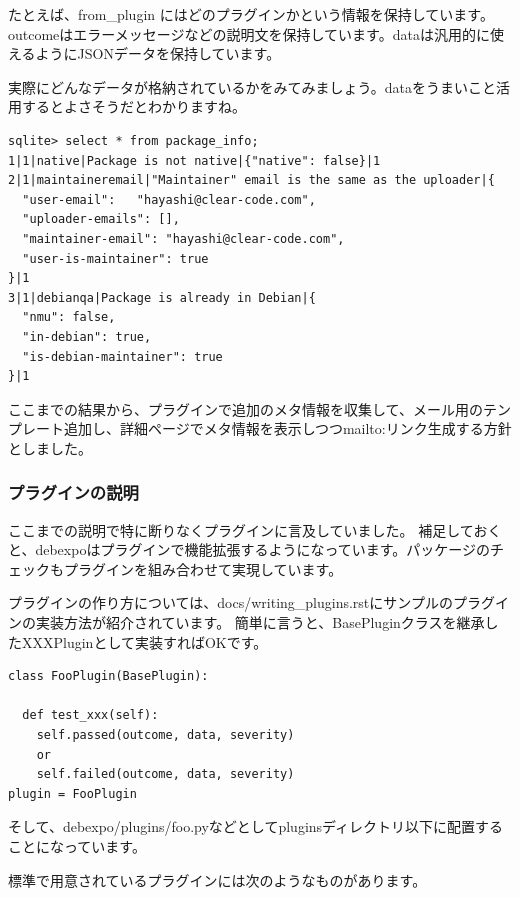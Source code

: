 \documentclass[mingoth,a4paper]{jsarticle}
\begin{document}
たとえば、from\_plugin にはどのプラグインかという情報を保持しています。outcomeはエラーメッセージなどの説明文を保持しています。dataは汎用的に使えるようにJSONデータを保持しています。

実際にどんなデータが格納されているかをみてみましょう。dataをうまいこと活用するとよさそうだとわかりますね。

\begin{screen}
\begin{verbatim}
sqlite> select * from package_info;
1|1|native|Package is not native|{"native": false}|1
2|1|maintaineremail|"Maintainer" email is the same as the uploader|{
  "user-email":   "hayashi@clear-code.com",
  "uploader-emails": [],
  "maintainer-email": "hayashi@clear-code.com",
  "user-is-maintainer": true
}|1
3|1|debianqa|Package is already in Debian|{
  "nmu": false,
  "in-debian": true,
  "is-debian-maintainer": true
}|1
\end{verbatim}
\end{screen}

ここまでの結果から、プラグインで追加のメタ情報を収集して、メール用のテンプレート追加し、詳細ページでメタ情報を表示しつつmailto:リンク生成する方針としました。

\subsubsection{プラグインの説明}

ここまでの説明で特に断りなくプラグインに言及していました。
補足しておくと、debexpoはプラグインで機能拡張するようになっています。パッケージのチェックもプラグインを組み合わせて実現しています。

プラグインの作り方については、docs/writing\_plugins.rstにサンプルのプラグインの実装方法が紹介されています。
簡単に言うと、BasePluginクラスを継承したXXXPluginとして実装すればOKです。

\begin{screen}
\begin{verbatim}
class FooPlugin(BasePlugin):

  def test_xxx(self):
    self.passed(outcome, data, severity)
    or
    self.failed(outcome, data, severity)
plugin = FooPlugin
\end{verbatim}
\end{screen}

そして、debexpo/plugins/foo.pyなどとしてpluginsディレクトリ以下に配置することになっています。

標準で用意されているプラグインには次のようなものがあります。
\end{document}
